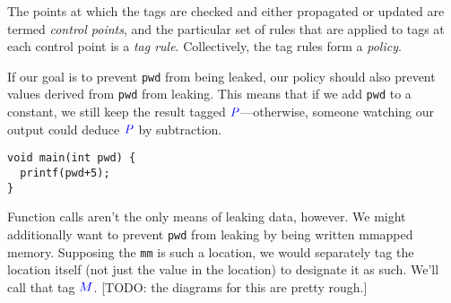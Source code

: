 \documentclass{llncs}
\begin{document}

The points at which the tags are checked and either propagated or updated are termed
{\em control points}, and the particular set of rules that are applied to tags at each
control point is a {\em tag rule}. Collectively, the tag rules form a {\em policy}.

If our goal is to prevent {\tt pwd} from being leaked, our policy should also prevent
values derived from {\tt pwd} from leaking. This means that if we add {\tt pwd} to a
constant, we still keep the result tagged \(\mathit{\color{blue} P}\)---otherwise, someone watching our output
could deduce \(\mathit{\color{blue} P}\) by subtraction.

\begin{verbatim}
void main(int pwd) {
  printf(pwd+5);
}
\end{verbatim}

Function calls aren't the only means of leaking data, however. We might additionally want
to prevent {\tt pwd} from leaking by being written mmapped memory. Supposing the {\tt mm} is
such a location, we would separately tag the location itself (not just the value in the
location) to designate it as such. We'll call that tag \({\color{blue} M}\). [TODO: the diagrams for this are pretty rough.]
\end{document}
